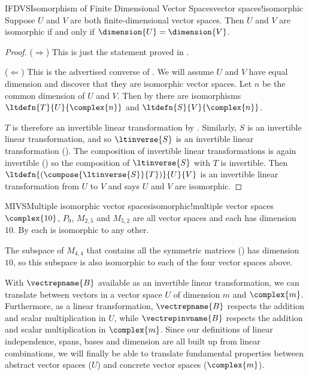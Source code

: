 %
\begin{theorem}{IFDVS}{Isomorphism of Finite Dimensional Vector Spaces}{vector spaces!isomorphic}
Suppose $U$ and $V$ are both finite-dimensional vector spaces.  Then $U$ and $V$ are isomorphic if and only if $\dimension{U}=\dimension{V}$.
\end{theorem}
%
\begin{proof}
($\Rightarrow$)  This is just the statement proved in .\par
%
($\Leftarrow$)  This is the advertised converse of .  We will assume $U$ and $V$ have equal dimension and discover that they are isomorphic vector spaces.  Let $n$ be the common dimension of $U$ and $V$.  Then by  there are isomorphisms $\ltdefn{T}{U}{\complex{n}}$ and $\ltdefn{S}{V}{\complex{n}}$.\par
%
$T$ is therefore an invertible linear transformation by .  Similarly, $S$ is an invertible linear transformation, and so $\ltinverse{S}$ is  an invertible linear transformation ().  The composition of invertible linear transformations is again invertible ()
so the composition of $\ltinverse{S}$ with $T$ is invertible.  Then $\ltdefn{\left(\compose{\ltinverse{S}}{T}\right)}{U}{V}$ is an invertible linear transformation from $U$ to $V$ and  says $U$ and $V$ are isomorphic.
%
\end{proof}
%
%
\begin{example}{MIVS}{Multiple isomorphic vector spaces}{isomorphic!multiple vector spaces}
$\complex{10}$, $P_{9}$, $M_{2,5}$ and $M_{5,2}$ are all vector spaces and each has dimension 10.  By  each is isomorphic to any other.\par
%
The subspace of $M_{4,4}$ that contains all the symmetric matrices () has dimension $10$, so this subspace is also isomorphic to each of the four vector spaces above.
%
\end{example}
%
%
With $\vectrepname{B}$ available as an invertible linear transformation, we can translate between vectors in a vector space $U$ of dimension $m$ and $\complex{m}$.  Furthermore, as a linear transformation, $\vectrepname{B}$ respects the addition and scalar multiplication in $U$, while $\vectrepinvname{B}$ respects the addition and scalar multiplication in $\complex{m}$.  Since our definitions of linear independence, spans, bases and dimension are all built up from linear combinations, we will finally be able to translate fundamental properties between abstract vector spaces ($U$) and concrete vector spaces ($\complex{m}$).
